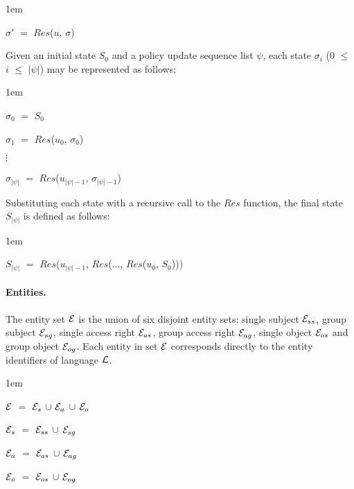 \documentclass[11pt]{report}
\newenvironment{vquote}
{
  \begin{list}{}{\leftmargin 1em}\item[]
}
{
  \end{list}
}
\begin{document}
          \begin{vquote}
            $\sigma'$ $=$ $Res$($u$, $\sigma$)
          \end{vquote}

          \noindent
          Given an initial state $S_{0}$ and a policy update sequence list
          $\psi$, each state $\sigma_{i}$ ($0$ $\leq$ $i$ $\leq$ $|\psi|$)
          may be represented as follows:

          \begin{vquote}
            $\sigma_{0}$ $=$ $S_{0}$

            $\sigma_{1}$ $=$ $Res$($u_{0}$, $\sigma_{0}$)

            $\vdots$

            $\sigma_{|\psi|}$ $=$
              $Res$($u_{|\psi| - 1}$, $\sigma_{|\psi| - 1}$)
          \end{vquote}

          \noindent
          Substituting each state with a recursive call to the $Res$ function,
          the final state $S_{|\psi|}$ is defined as follows:

          \begin{vquote}
            $S_{|\psi|}$ $=$
              $Res$($u_{|\psi| - 1}$, $Res$($\ldots$, $Res$($u_{0}$, $S_{0}$)))
          \end{vquote}

          \paragraph{Entities.}

            The entity set ${\cal E}$ is the union of six disjoint entity sets:
            single subject ${\cal E}_{ss}$, group subject ${\cal E}_{sg}$,
            single access right ${\cal E}_{as}$, group access right
            ${\cal E}_{ag}$, single object ${\cal E}_{os}$ and group object
            ${\cal E}_{og}$. Each entity in set ${\cal E}$ corresponds directly
            to the entity identifiers of language ${\cal L}$.

            \begin{vquote}
              ${\cal E}$ $=$
              ${\cal E}_{s}$ $\cup$ ${\cal E}_{a}$ $\cup$ ${\cal E}_{o}$

              ${\cal E}_{s}$ $=$ ${\cal E}_{ss}$ $\cup$ ${\cal E}_{sg}$

              ${\cal E}_{a}$ $=$ ${\cal E}_{as}$ $\cup$ ${\cal E}_{ag}$

              ${\cal E}_{o}$ $=$ ${\cal E}_{os}$ $\cup$ ${\cal E}_{og}$
            \end{vquote}
\end{document}

